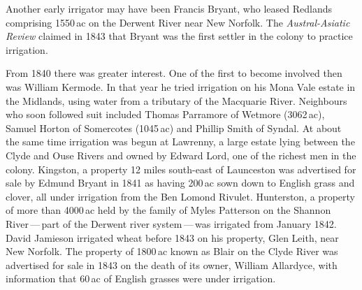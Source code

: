 Another early irrigator may have been Francis Bryant, who leased Redlands comprising 1550\,ac on the
Derwent River near New Norfolk.  The \textsl{Austral-Asiatic Review}
claimed in 1843 that Bryant was the first settler in the colony to
practice irrigation.

From 1840 there was greater interest.  One of the first to become
involved then was William Kermode.  In that year he
tried irrigation on his Mona Vale estate in the
Midlands, using water from a tributary of the Macquarie
River. Neighbours who soon followed suit
included Thomas Parramore of
Wetmore (3062\,ac), Samuel Horton of
Somercotes (1045\,ac) and Phillip Smith of Syndal.
At about the same time irrigation was begun at Lawrenny, a large
estate lying between the Clyde  and Ouse
Rivers and owned by Edward Lord, one
of the richest men in the colony.  Kingston, a
property 12 miles south-east of Launceston was
advertised for sale by Edmund Bryant in 1841 as having 200\,ac sown
down to English grass and clover, all under irrigation from the Ben
Lomond Rivulet. Hunterston, a property of more
than 4000\,ac held by the family of Myles Patterson on the Shannon River\,---\,part of the
Derwent river system\,---\,was irrigated from January 1842.  David
Jamieson  irrigated wheat before 1843 on his
property, Glen Leith, near New Norfolk.  The property of 1800\,ac
known as Blair on the Clyde River was advertised for sale in 1843 on
the death of its owner, William Allardyce, with
information that 60\,ac of English grasses were under
irrigation.

